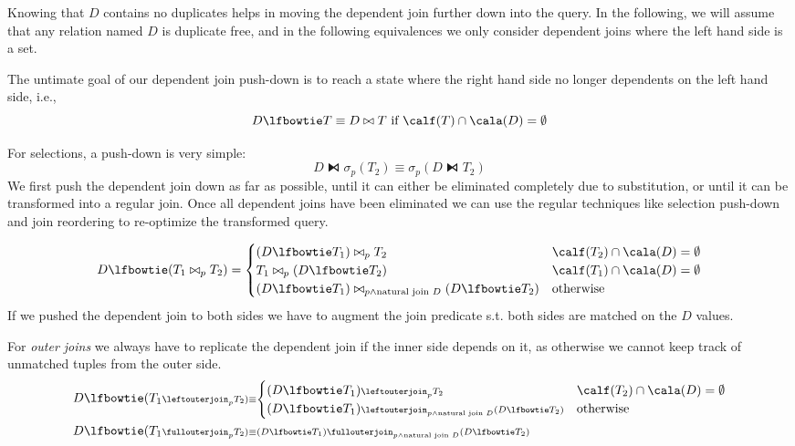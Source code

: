 \documentclass[11pt]{article}
\begin{document}
Knowing that \(D\) contains no duplicates helps in moving the dependent join further down into the
query. In the following, we will assume that any relation named \(D\) is duplicate free, and in the
following equivalences we only consider dependent joins where the left hand side is a set.

The untimate goal of our dependent join push-down is to reach a state where the right hand side no
longer dependents on the left hand side, i.e.,
\begin{equation*}
D\lfbowtie T\equiv D\bowtie T\text{ if }\calf(T)\cap\cala(D)=\emptyset
\end{equation*}

For selections, a push-down is very simple:
\begin{equation*}
D\lfbowtie \sigma_p(T_2)\equiv\sigma_p(D\lfbowtie T_2)
\end{equation*}
We first push the dependent join down as far as possible, until it can either be eliminated completely
due to substitution, or until it can be transformed into a regular join. Once all dependent joins have
been eliminated we can use the regular techniques like selection push-down and join reordering to
re-optimize the transformed query.

\begin{equation*}
D\lfbowtie(T_1\bowtie_pT_2)=
\begin{cases}
(D\lfbowtie T_1)\bowtie_pT_2&\calf(T_2)\cap\cala(D)=\emptyset\\
T_1\bowtie_p(D\lfbowtie T_2)&\calf(T_1)\cap\cala(D)=\emptyset\\
(D\lfbowtie T_1)\bowtie_{p\wedge\text{natural join }D}(D\lfbowtie T_2)&\text{otherwise}
\end{cases}
\end{equation*}
If we pushed the dependent join to both sides we have to augment the join predicate s.t. both sides
are matched on the \(D\) values.

For \emph{outer joins} we always have to replicate the dependent join if the inner side depends on it, as
otherwise we cannot keep track of unmatched tuples from the outer side.
\begin{align*}
&D\lfbowtie(T_1\scriptstyle\leftouterjoin_pT_2)\equiv
\begin{cases}
(D\lfbowtie T_1)\scriptstyle\leftouterjoin_pT_2&\calf(T_2)\cap\cala(D)=\emptyset\\
(D\lfbowtie T_1)\scriptstyle\leftouterjoin_{p\wedge\text{natural join }D}(D\lfbowtie T_2)&\text{otherwise}\\
\end{cases}\\
&D\lfbowtie(T_1\scriptstyle\fullouterjoin_pT_2)\equiv(D\lfbowtie T_1)\scriptstyle\fullouterjoin_{p\wedge\text{natural join }D}(D\lfbowtie T_2)
\end{align*}
\end{document}
